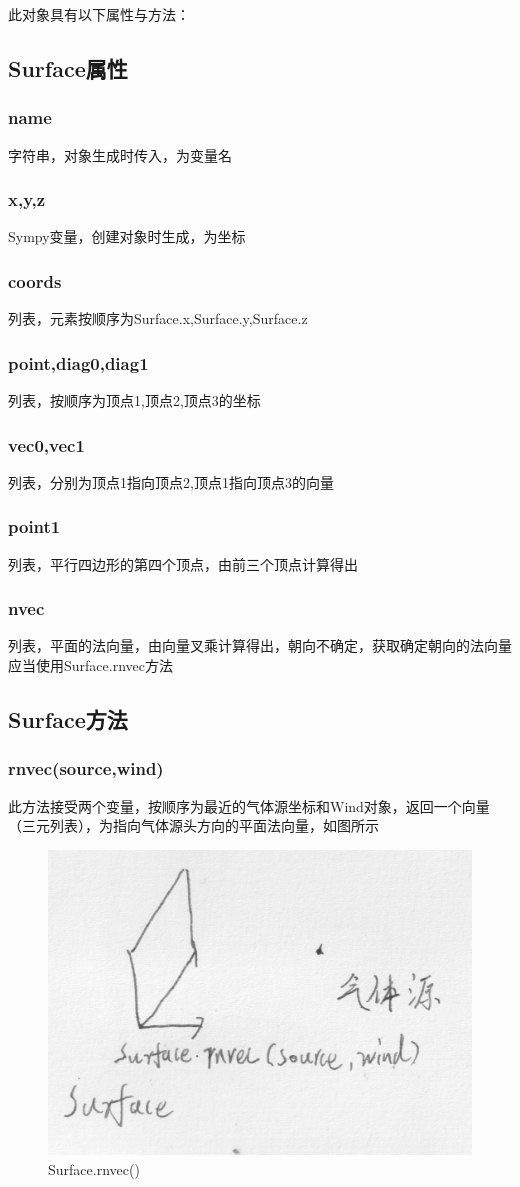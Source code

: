 \documentclass[]{ctexart}
\begin{document}
此对象具有以下属性与方法：
\subsection{Surface属性}
\subsubsection{name}
字符串，对象生成时传入，为变量名
\subsubsection{x,y,z}
Sympy变量，创建对象时生成，为坐标
\subsubsection{coords}
列表，元素按顺序为Surface.x,Surface.y,Surface.z
\subsubsection{point,diag0,diag1}
列表，按顺序为顶点1,顶点2,顶点3的坐标
\subsubsection{vec0,vec1}
列表，分别为顶点1指向顶点2,顶点1指向顶点3的向量
\subsubsection{point1}
列表，平行四边形的第四个顶点，由前三个顶点计算得出
\subsubsection{nvec}
列表，平面的法向量，由向量叉乘计算得出，朝向不确定，获取确定朝向的法向量应当使用Surface.rnvec方法
\subsection{Surface方法}
\subsubsection{rnvec(source,wind)}
此方法接受两个变量，按顺序为最近的气体源坐标和Wind对象，返回一个向量（三元列表），为指向气体源头方向的平面法向量，如图所示

\begin{figure}[h] 
  \centering
  \includegraphics[width=0.55
  \textwidth]{pic2.png} 
  \caption{Surface.rnvec()} 
  
\end{figure}
\end{document}
